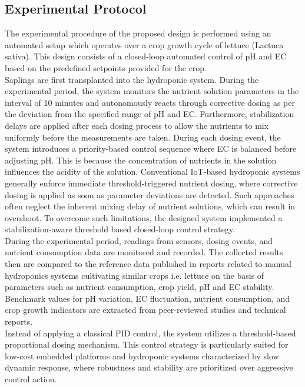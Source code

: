 \subsection{Experimental Protocol}
The experimental procedure of the proposed design is performed using an automated setup which operates over a crop growth cycle of lettuce (Lactuca sativa). This design consists of a closed-loop automated control of pH and EC based on the predefined setpoints provided for the crop.\\[10pt]
Saplings are first transplanted into the hydroponic system. During the experimental period, the system monitors the nutrient solution parameters in the interval of 10 minutes and autonomously reacts through corrective dosing as per the deviation from the specified range of pH and EC. Furthermore, stabilization delays are applied after each dosing process to allow the nutrients to mix uniformly before the measurements are taken. During each dosing event, the system introduces a priority-based control sequence where EC is balanced before adjusting pH. This is because the concentration of nutrients in the solution influences the acidity of the solution. Conventional IoT-based hydroponic systems generally enforce immediate threshold-triggered nutrient dosing, where corrective dosing is applied as soon as parameter deviations are detected. Such approaches often neglect the inherent mixing delay of nutrient solutions, which can result in overshoot. To overcome such limitations, the designed system implemented a stabilization-aware threshold based closed-loop control strategy. \\[10pt]
During the experimental period, readings from sensors, dosing events, and nutrient consumption data are monitored and recorded. The collected results then are compared to the reference data published in reports related to manual hydroponics systems cultivating similar crops i.e. lettuce on the basis of parameters such as nutrient consumption, crop yield, pH and EC stability. Benchmark values for pH variation, EC fluctuation, nutrient consumption, and crop growth indicators are extracted from peer-reviewed studies and technical reports.\\[10pt]
Instead of applying a classical PID control, the system utilizes a threshold-based proportional dosing mechanism. This control strategy is particularly suited for low-cost embedded platforms and hydroponic systems characterized by slow dynamic response, where robustness and stability are prioritized over aggressive control action.


